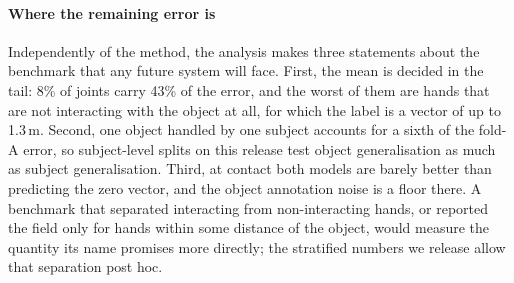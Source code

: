 \paragraph{Where the remaining error is}
Independently of the method, the analysis makes three statements about the benchmark that any future system will face. First, the mean is decided in the tail: 8\% of joints carry 43\% of the error, and the worst of them are hands that are not interacting with the object at all, for which the label is a vector of up to 1.3\,m. Second, one object handled by one subject accounts for a sixth of the fold-A error, so subject-level splits on this release test object generalisation as much as subject generalisation. Third, at contact both models are barely better than predicting the zero vector, and the object annotation noise is a floor there. A benchmark that separated interacting from non-interacting hands, or reported the field only for hands within some distance of the object, would measure the quantity its name promises more directly; the stratified numbers we release allow that separation post hoc.
